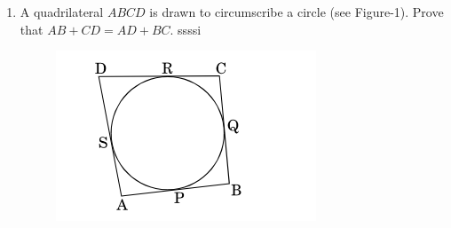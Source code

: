 
\begin{enumerate}
	\item A quadrilateral $ABCD$ is drawn to circumscribe a circle (see Figure-1). Prove that $AB + CD = AD + BC$.
ssssi	\begin{figure}[!htb]
		\centering
			\includegraphics[width=\columnwidth]{figs/circ-1.png}
		

\end{figure}
\end{enumerate}
